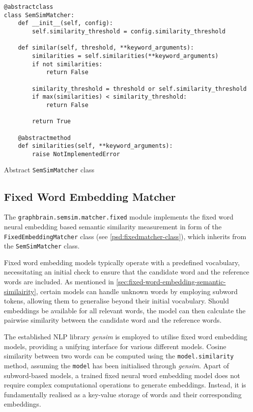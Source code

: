 \documentclass[11pt, numbers=noenddot]{scrreprt}
\let\cite\parencite  %
\begin{document}
\begin{pseudo}
\begin{lstlisting}
@abstractclass
class SemSimMatcher:
    def __init__(self, config):
        self.similarity_threshold = config.similarity_threshold

    def similar(self, threshold, **keyword_arguments):
        similarities = self.similarities(**keyword_arguments)
        if not similarities:
            return False

        similarity_threshold = threshold or self.similarity_threshold
        if max(similarities) < similarity_threshold:
            return False

        return True

    @abstractmethod
    def similarities(self, **keyword_arguments):
        raise NotImplementedError
\end{lstlisting}
\caption{Abstract \texttt{SemSimMatcher} class}
\label{psd:semsimmatcher-class}
\end{pseudo}


\subsection{Fixed Word Embedding Matcher}
\label{sec:fixed-word-embedding-matcher}
The \texttt{graphbrain.semsim.matcher.fixed} module implements the fixed word neural embedding based semantic similarity measurement in form of the \texttt{FixedEmbeddingMatcher} class (see \cref{psd:fixedmatcher-class}), which inherits from the \texttt{SemSimMatcher} class.

Fixed word embedding models typically operate with a predefined vocabulary, necessitating an initial check to ensure that the candidate word and the reference words are included. As mentioned in \cref{sec:fixed-word-embedding-semantic-similairity}, certain models can handle unknown words by employing subword tokens, allowing them to generalise beyond their initial vocabulary. Should embeddings be available for all relevant words, the model can then calculate the pairwise similarity between the candidate word and the reference words.

The established NLP library \textit{gensim} \cite{rehurek_lrec} is employed to utilise fixed word embedding models, providing a unifying interface for various different models. Cosine similarity between two words can be computed using the \texttt{model.similarity} method, assuming the \texttt{model} has been initialised through \textit{gensim}. Apart of subword-based models, a trained fixed neural word embedding model does not require complex computational operations to generate embeddings. Instead, it is fundamentally realised as a key-value storage of words and their corresponding embeddings.
\end{document}
